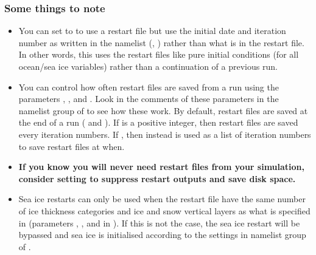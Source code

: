 \clearpage
\subsubsection{Some things to note}

\begin{itemize}
    \item You can set  to  to use a restart file but use the initial date and iteration number as written in the namelist (, ) rather than what is in the restart file.
    In other words, this uses the restart files like pure initial conditions (for all ocean/sea ice variables) rather than a continuation of a previous run.

    \item You can control how often restart files are saved from a run using the parameters , , and .
    Look in the comments of these parameters in the namelist group  of  to see how these work.
    By default, restart files are saved at the end of a run ( and ).
    If  is a positive integer, then restart files are saved every  iteration numbers.
    If , then instead  is used as a list of iteration numbers to save restart files at when.

    \item \textbf{If you know you will never need restart files from your simulation, consider setting  to suppress restart outputs and save disk space.}

    \item Sea ice restarts can only be used when the restart file have the same number of ice thickness categories and ice and snow vertical layers as what is specified in  (parameters , , and  in ).
    If this is not the case, the sea ice restart will be bypassed and sea ice is initialised according to the settings in namelist group  of .
\end{itemize}
